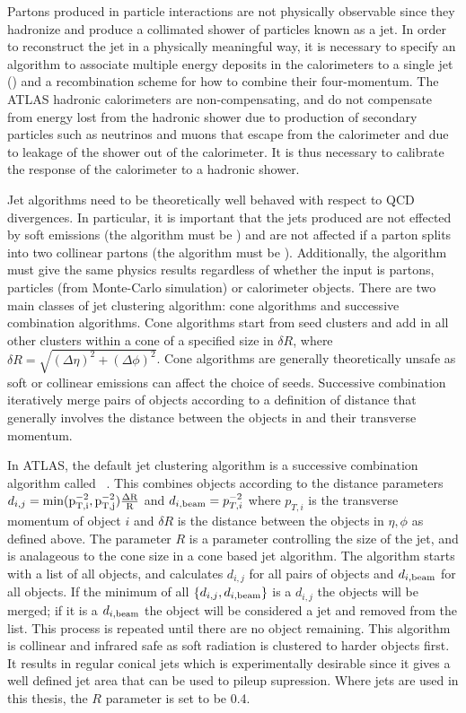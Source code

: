 Partons produced in particle interactions are not physically observable since
they hadronize and produce a collimated shower of particles known as a jet. In
order to reconstruct the jet in a physically meaningful way, it is necessary to
specify an algorithm to associate multiple energy deposits in the calorimeters
to a single jet () and a recombination scheme for how to combine their
four-momentum. The ATLAS hadronic calorimeters are non-compensating, and do not
compensate from energy lost from the hadronic shower due to production of
secondary particles such as neutrinos and muons that escape from the calorimeter
and due to leakage of the shower out of the calorimeter. It is thus necessary to
calibrate the response of the calorimeter to a hadronic shower.

Jet algorithms need to be theoretically well behaved with respect to QCD
divergences. In particular, it is important that the jets produced are not
effected by soft emissions (the algorithm must be ) and
are not affected if a parton splits into two collinear partons (the algorithm
must be ). Additionally, the algorithm must give the same
physics results regardless of whether the input is partons, particles (from
Monte-Carlo simulation) or calorimeter objects. There are two main classes of
jet clustering algorithm: cone algorithms and successive combination algorithms.
Cone algorithms start from seed clusters and add in all other clusters within a
cone of a specified size in $\delta R$, where $\delta R = \sqrt{(\Delta \eta)^{2} + (\Delta
\phi)^{2}} $. Cone algorithms are generally theoretically unsafe as soft or
collinear emissions can affect the choice of seeds. Successive combination
iteratively merge pairs of objects according to a definition of distance that
generally involves the distance between the objects in and their transverse
momentum.

In ATLAS, the default jet clustering algorithm is a successive combination
algorithm called \antikt~\cite{1126-6708-2008-04-063}. This combines objects
according to the distance parameters $d_{i,j} =
\rm{min}(p_{T,i}^{-2},p_{T,j}^{-2}) \frac{ \Delta R }{R}$ and $d_{i,\rm{beam}} =
p_{T,i}^{-2}$ where $p_{T,i}$ is the transverse momentum of object $i$ and
$\delta R$ is the distance between the objects in $\eta, \phi$ as defined above.
The parameter $R$ is a parameter controlling the size of the jet, and is
analageous to the cone size in a cone based jet algorithm. The algorithm starts
with a list of all objects, and calculates $d_{i,j}$ for all pairs of objects and
$d_{i,{\rm beam}}$ for all objects. If the minimum of all $\{ d_{i,j}, d_{i,{\rm
beam}} \}$ is a  $d_{i,j}$ the objects will be merged; if it is a $ d_{i,{\rm
beam}}$ the object will be considered a jet and removed from the list. This
process is repeated until there are no object remaining. This algorithm is
collinear and infrared safe as soft radiation is clustered to harder objects
first. It results in regular conical jets which is experimentally desirable
since it gives a well defined jet area that can be used to pileup supression.
Where jets are used in this thesis, the $R$ parameter is set to be 0.4.

